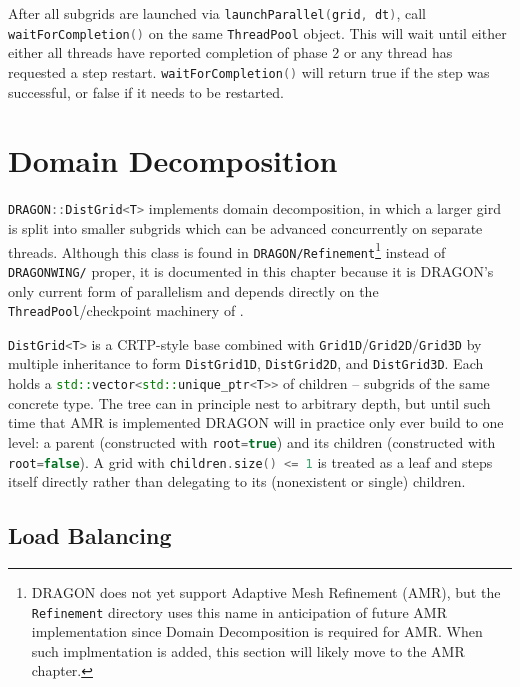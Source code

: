 \documentclass[11pt]{report}
\newcommand{\cpp}[1]{\lstinline[language=C++]{#1}}
\newcommand{\bash}[1]{\lstinline[language=bash]{#1}}
\begin{document}
After all subgrids are launched via \cpp{launchParallel(grid, dt)}, call \cpp{waitForCompletion()} on the same \cpp{ThreadPool} object.
This will wait until either either all threads have reported completion of phase 2 or any thread has requested a step restart. \cpp{waitForCompletion()} will return true if the step was successful, or false if it needs to be restarted.



\section{Domain Decomposition}
\label{sec:distgrid}

\cpp{DRAGON::DistGrid<T>} implements domain decomposition, in which a larger gird is split into smaller subgrids which can be advanced concurrently on separate threads.
 Although this class is found in \bash{DRAGON/Refinement}\footnote{
 DRAGON does not yet support Adaptive Mesh Refinement (AMR), but the \bash{Refinement} directory uses this name in anticipation of future AMR implementation since Domain Decomposition is required for AMR. When such implmentation is added, this section will likely move to the AMR chapter.
 } instead of \bash{DRAGONWING/} proper, it is documented in this chapter because it is DRAGON's only current form of parallelism and depends directly on the \cpp{ThreadPool}/checkpoint machinery of .


\cpp{DistGrid<T>} is a CRTP-style base combined with \cpp{Grid1D}/\cpp{Grid2D}/\cpp{Grid3D} by multiple inheritance to form \cpp{DistGrid1D}, \cpp{DistGrid2D}, and \cpp{DistGrid3D}. Each holds a \cpp{std::vector<std::unique_ptr<T>>} of children -- subgrids of the same concrete type.
The tree can in principle nest to arbitrary depth, but until such time that AMR is implemented  DRAGON will in practice only ever build to one level: a parent (constructed with \cpp{root=true}) and its children (constructed with \cpp{root=false}). A grid with \cpp{children.size() <= 1} is treated as a leaf and steps itself directly rather than delegating to its (nonexistent or single) children.

\subsection{Load Balancing}
\end{document}
